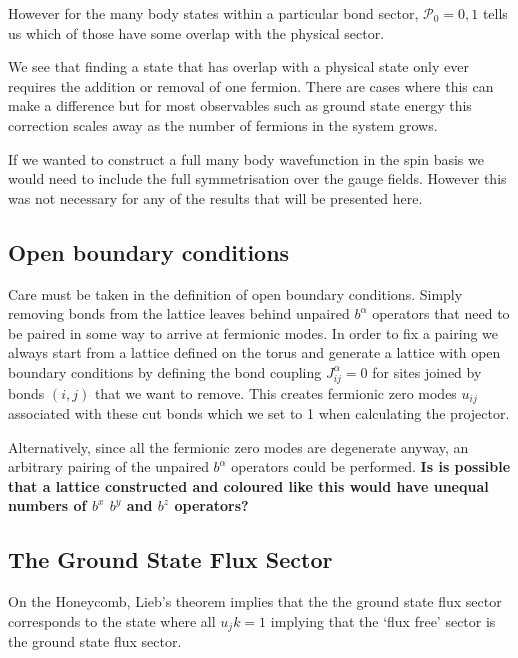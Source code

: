 However for the many body states within a particular bond sector,
\(\mathcal{P}_0 = 0,1\) tells us which of those have some overlap with
the physical sector.

We see that finding a state that has overlap with a physical state only
ever requires the addition or removal of one fermion. There are cases
where this can make a difference but for most observables such as ground
state energy this correction scales away as the number of fermions in
the system grows.

If we wanted to construct a full many body wavefunction in the spin
basis we would need to include the full symmetrisation over the gauge
fields. However this was not necessary for any of the results that will
be presented here.

\hypertarget{open-boundary-conditions}{%
\subsection{Open boundary conditions}\label{open-boundary-conditions}}

Care must be taken in the definition of open boundary conditions. Simply
removing bonds from the lattice leaves behind unpaired \(b^\alpha\)
operators that need to be paired in some way to arrive at fermionic
modes. In order to fix a pairing we always start from a lattice defined
on the torus and generate a lattice with open boundary conditions by
defining the bond coupling \(J^{\alpha}_{ij} = 0\) for sites joined by
bonds \((i,j)\) that we want to remove. This creates fermionic zero
modes \(u_{ij}\) associated with these cut bonds which we set to 1 when
calculating the projector.

Alternatively, since all the fermionic zero modes are degenerate anyway,
an arbitrary pairing of the unpaired \(b^\alpha\) operators could be
performed. \textbf{Is is possible that a lattice constructed and
coloured like this would have unequal numbers of \(b^x\) \(b^y\) and
\(b^z\) operators?}

\hypertarget{the-ground-state-flux-sector}{%
\subsection{The Ground State Flux
Sector}\label{the-ground-state-flux-sector}}

On the Honeycomb, Lieb's theorem implies that the the ground state flux
sector corresponds to the state where all \(u_jk = 1\) implying that the
`flux free' sector is the ground state flux sector.

